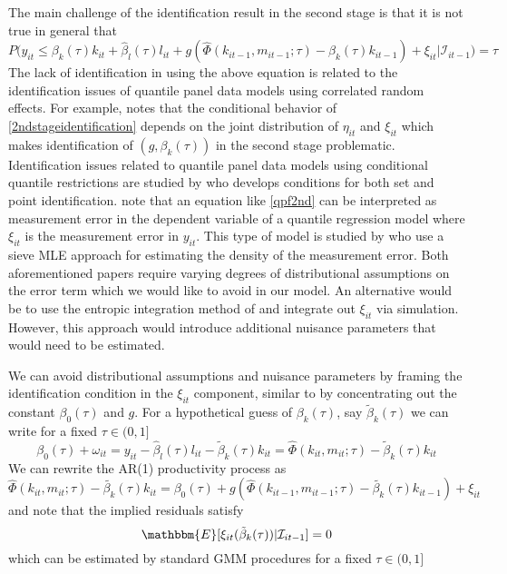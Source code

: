 \documentclass[11pt]{article}
\begin{document}
The main challenge of the identification result in the second stage is that it is not true in general that
\begin{equation} \label{2ndstageidentification}
P\big(y_{it}\leq \beta_{k}(\tau)k_{it}+\hat{\beta}_{l}(\tau)l_{it}+g(\hat{\Phi}(k_{it-1}, m_{it-1}; \tau)-\beta_{k}(\tau)k_{it-1})+\xi_{it}|\mathcal{I}_{it-1}\big)=\tau
\end{equation}
The lack of identification in using the above equation is related to the identification issues of quantile panel data models using correlated random effects. For example, \cite{Canay2011} notes that the conditional behavior of \eqref{2ndstageidentification} depends on the joint distribution of $\eta_{it}$ and $\xi_{it}$ which makes identification of $(g, \beta_{k}(\tau))$ in the second stage problematic. Identification issues related to quantile panel data models using conditional quantile restrictions are studied by \cite{Rosen2012} who develops conditions for both set and point identification. \cite{Cai2018} note that an equation like \eqref{qpf2nd} can be interpreted as measurement error in the dependent variable of a quantile regression model where $\xi_{it}$ is the measurement error in $y_{it}$. This type of model is studied by \cite{Hausman2019} who use a sieve MLE approach for estimating the density of the measurement error. Both aforementioned papers require varying degrees of distributional assumptions on the error term which we would like to avoid in our model. An alternative would be to use the entropic integration method of \cite{2014a} and integrate out $\xi_{it}$ via simulation. However, this approach would introduce additional nuisance parameters that would need to be estimated. 

We can avoid distributional assumptions and nuisance parameters by framing the identification condition in the $\xi_{it}$ component, similar to \cite{Ackerberg2015} by concentrating out the constant $\beta_{0}(\tau)$ and $g$. For a hypothetical guess of $\beta_{k}(\tau)$, say  $\tilde{\beta}_{k}(\tau)$ we can write for a fixed $\tau\in (0,1]$
\begin{equation}
\beta_{0}(\tau)+\omega_{it}=y_{it}-\hat{\beta}_{l}(\tau)l_{it}-\tilde{\beta}_{k}(\tau)k_{it}=\hat{\Phi}(k_{it}, m_{it}; \tau)-\tilde{\beta}_{k}(\tau)k_{it}
\end{equation}
We can rewrite the AR(1) productivity process as
\begin{equation}
\hat{\Phi}(k_{it}, m_{it}; \tau)-\tilde{\beta_{k}}(\tau)k_{it}=\beta_{0}(\tau)+g(\hat{\Phi}(k_{it-1}, m_{it-1}; \tau)-\tilde{\beta_{k}}(\tau)k_{it-1})+\xi_{it}
\end{equation}
and note that the implied residuals satisfy
\begin{equation} \label{2ndxi}
\mathbbm{E}[\xi_{it}(\tilde{\beta}_{k}(\tau))|\mathcal{I}_{it-1}]=0
\end{equation}
which can be estimated by standard GMM procedures for a fixed $\tau\in (0,1]$\\
\end{document}

